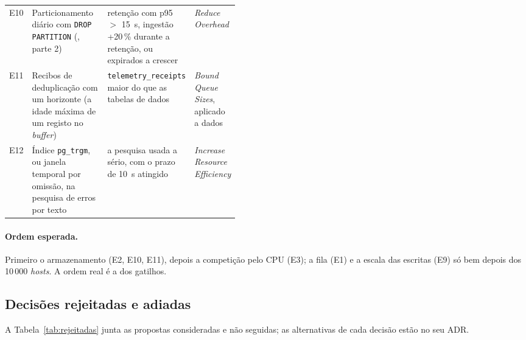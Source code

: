 \begin{table}[htbp]
\begin{tabularx}{\linewidth}{lYL{0.27\linewidth}L{0.17\linewidth}}
    E10 & Particionamento diário com \texttt{DROP PARTITION} (, parte 2) & retenção com p95 $>$ 15~s, ingestão +20\,\% durante a retenção, ou expirados a crescer & \emph{Reduce Overhead} \\
    E11 & Recibos de deduplicação com um horizonte (a idade máxima de um registo no \emph{buffer}) & \texttt{telemetry\_receipts} maior do que as tabelas de dados & \emph{Bound Queue Sizes}, aplicado a dados \\
    E12 & Índice \texttt{pg\_trgm}, ou janela temporal por omissão, na pesquisa de erros por texto & a pesquisa usada a sério, com o prazo de 10~s atingido & \emph{Increase Resource Efficiency} \\
    \bottomrule
  \end{tabularx}
\end{table}

\paragraph{Ordem esperada.}
Primeiro o armazenamento (E2, E10, E11), depois a competição pelo CPU (E3); a fila (E1) e a escala das escritas
(E9) só bem depois dos 10\,000 \emph{hosts}. A ordem real é a dos gatilhos.

\subsection{Decisões rejeitadas e adiadas}

A Tabela~\ref{tab:rejeitadas} junta as propostas consideradas e não seguidas; as alternativas de cada decisão estão
no seu ADR.


